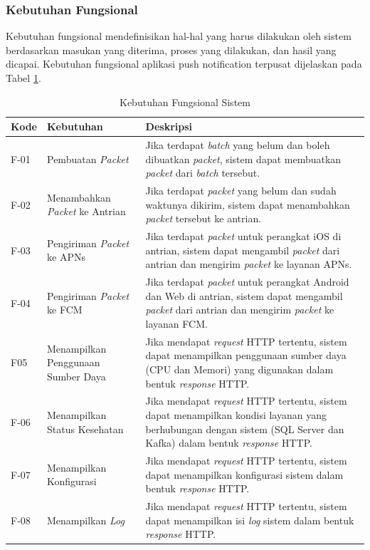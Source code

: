 \subsubsection{Kebutuhan Fungsional}
\par Kebutuhan fungsional mendefinisikan hal-hal yang harus dilakukan oleh sistem berdasarkan masukan yang diterima, proses yang dilakukan, dan hasil yang dicapai. Kebutuhan fungsional aplikasi push notification terpusat dijelaskan pada Tabel \ref{t:fungsional}.
\begin{longtable}{|p{1cm}|p{3cm}|p{5cm}|}
    \caption{Kebutuhan Fungsional Sistem} \label{t:fungsional} \\ \hline
    \rowcolor{lightgray} Kode & {Kebutuhan} & Deskripsi \\ \hline
    F-01 & Pembuatan \textit{Packet} & Jika terdapat \textit{batch} yang belum dan boleh dibuatkan \textit{packet}, sistem dapat membuatkan \textit{packet} dari \textit{batch} tersebut. \\ \hline
    F-02 & Menambahkan \textit{Packet} ke Antrian & Jika terdapat \textit{packet} yang belum dan sudah waktunya dikirim, sistem dapat menambahkan \textit{packet} tersebut ke antrian. \\ \hline
    F-03 & Pengiriman \textit{Packet} ke APNs & Jika terdapat \textit{packet} untuk perangkat iOS di antrian, sistem dapat mengambil \textit{packet} dari antrian dan mengirim \textit{packet} ke layanan APNs. \\ \hline
    F-04 & Pengiriman \textit{Packet} ke FCM & Jika terdapat \textit{packet} untuk perangkat Android dan Web di antrian, sistem dapat mengambil \textit{packet} dari antrian dan mengirim \textit{packet} ke layanan FCM. \\ \hline
    F05 & Menampilkan Penggunaan Sumber Daya & Jika mendapat \textit{request} HTTP tertentu, sistem dapat menampilkan penggunaan sumber daya (CPU dan Memori) yang digunakan dalam bentuk \textit{response} HTTP. \\ \hline
    F-06 & Menampilkan Status Kesehatan & Jika mendapat \textit{request} HTTP tertentu, sistem dapat menampilkan kondisi layanan yang berhubungan dengan sistem (SQL Server dan Kafka) dalam bentuk \textit{response} HTTP. \\ \hline
    F-07 & Menampilkan Konfigurasi & Jika mendapat \textit{request} HTTP tertentu, sistem dapat menampilkan konfigurasi sistem dalam bentuk \textit{response} HTTP. \\ \hline
    F-08 & Menampilkan \textit{Log} & Jika mendapat \textit{request} HTTP tertentu, sistem dapat menampilkan isi \textit{log} sistem dalam bentuk \textit{response} HTTP. \\ \hline
\end{longtable}

